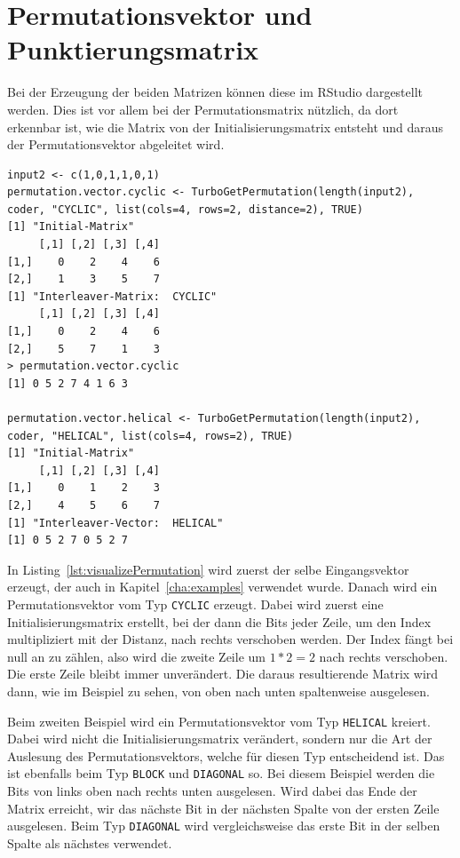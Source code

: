 \section{Permutationsvektor und Punktierungsmatrix}
\label{sec:visualization_punctuationPermutation}
Bei der Erzeugung der beiden Matrizen können diese im RStudio dargestellt werden. Dies ist vor allem bei der Permutationsmatrix nützlich, da dort erkennbar ist, wie die Matrix von der Initialisierungsmatrix entsteht und daraus der Permutationsvektor abgeleitet wird. 

\begin{lstlisting}[caption=Visualisierung der Permutationsmatrix, label={lst:visualizePermutation}, float=th]
input2 <- c(1,0,1,1,0,1)
permutation.vector.cyclic <- TurboGetPermutation(length(input2), coder, "CYCLIC", list(cols=4, rows=2, distance=2), TRUE)
[1] "Initial-Matrix"
     [,1] [,2] [,3] [,4]
[1,]    0    2    4    6
[2,]    1    3    5    7
[1] "Interleaver-Matrix:  CYCLIC"
     [,1] [,2] [,3] [,4]
[1,]    0    2    4    6
[2,]    5    7    1    3
> permutation.vector.cyclic
[1] 0 5 2 7 4 1 6 3

permutation.vector.helical <- TurboGetPermutation(length(input2), coder, "HELICAL", list(cols=4, rows=2), TRUE)
[1] "Initial-Matrix"
     [,1] [,2] [,3] [,4]
[1,]    0    1    2    3
[2,]    4    5    6    7
[1] "Interleaver-Vector:  HELICAL"
[1] 0 5 2 7 0 5 2 7
\end{lstlisting}

In Listing~\ref{lst:visualizePermutation} wird zuerst der selbe Eingangsvektor erzeugt, der auch in Kapitel~\ref{cha:examples} verwendet wurde. Danach wird ein Permutationsvektor vom Typ \texttt{CYCLIC} erzeugt. Dabei wird zuerst eine Initialisierungsmatrix erstellt, bei der dann die Bits jeder Zeile, um den Index multipliziert mit der Distanz, nach rechts verschoben werden. Der Index fängt bei null an zu zählen, also wird die zweite Zeile um $1*2 = 2$ nach rechts verschoben. Die erste Zeile bleibt immer unverändert. Die daraus resultierende Matrix wird dann, wie im Beispiel zu sehen, von oben nach unten spaltenweise ausgelesen.

Beim zweiten Beispiel wird ein Permutationsvektor vom Typ \texttt{HELICAL} kreiert. Dabei wird nicht die Initialisierungsmatrix verändert, sondern nur die Art der Auslesung des Permutationsvektors, welche für diesen Typ entscheidend ist. Das ist ebenfalls beim Typ \texttt{BLOCK} und \texttt{DIAGONAL} so. Bei diesem Beispiel werden die Bits von links oben nach rechts unten ausgelesen. Wird dabei das Ende der Matrix erreicht, wir das nächste Bit in der nächsten Spalte von der ersten Zeile ausgelesen. Beim Typ \texttt{DIAGONAL} wird vergleichsweise das erste Bit in der selben Spalte als nächstes verwendet.

